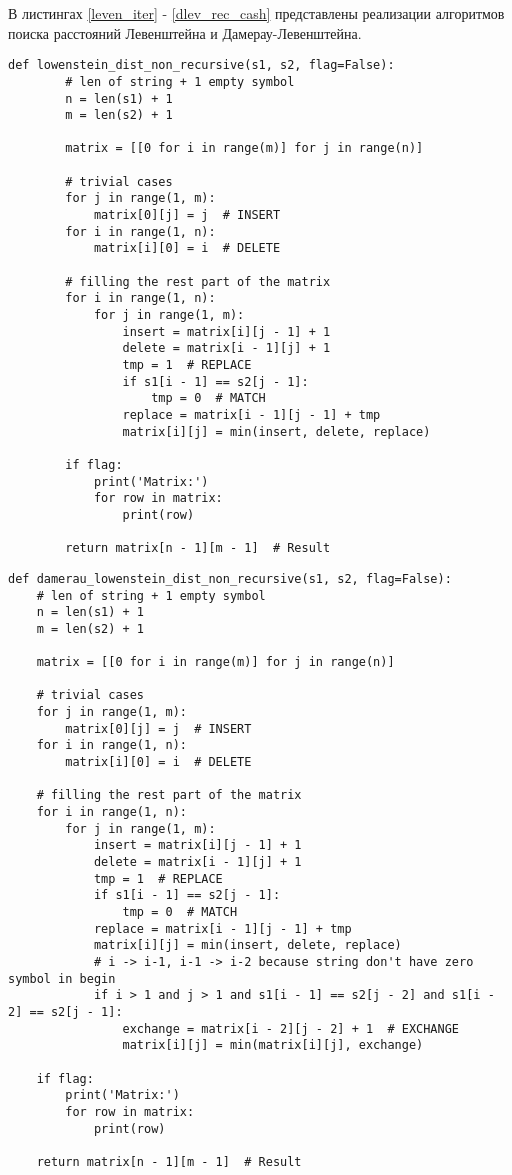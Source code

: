 В листингах \ref{leven_iter} - \ref{dlev_rec_cash} представлены реализации алгоритмов поиска расстояний Левенштейна и Дамерау-Левенштейна.

\begin{lstlisting}[caption=Функция итеративного алгоритма поиска расстояния Левенштейна с заполнением матрицы расстояний, 
    label={leven_iter}]
	def lowenstein_dist_non_recursive(s1, s2, flag=False):
        # len of string + 1 empty symbol
        n = len(s1) + 1
        m = len(s2) + 1

        matrix = [[0 for i in range(m)] for j in range(n)]

        # trivial cases
        for j in range(1, m):
            matrix[0][j] = j  # INSERT
        for i in range(1, n):
            matrix[i][0] = i  # DELETE

        # filling the rest part of the matrix
        for i in range(1, n):
            for j in range(1, m):
                insert = matrix[i][j - 1] + 1
                delete = matrix[i - 1][j] + 1
                tmp = 1  # REPLACE
                if s1[i - 1] == s2[j - 1]:
                    tmp = 0  # MATCH
                replace = matrix[i - 1][j - 1] + tmp
                matrix[i][j] = min(insert, delete, replace)

        if flag:
            print('Matrix:')
            for row in matrix:
                print(row)

        return matrix[n - 1][m - 1]  # Result
\end{lstlisting}


\begin{lstlisting}[caption=Функция итеративного алгоритма поиска расстояния Дамерау-Левенштейна с заполнением матрицы расстояний,
    label={dleven_iter}]
def damerau_lowenstein_dist_non_recursive(s1, s2, flag=False):
    # len of string + 1 empty symbol
    n = len(s1) + 1
    m = len(s2) + 1

    matrix = [[0 for i in range(m)] for j in range(n)]

    # trivial cases
    for j in range(1, m):
        matrix[0][j] = j  # INSERT
    for i in range(1, n):
        matrix[i][0] = i  # DELETE

    # filling the rest part of the matrix
    for i in range(1, n):
        for j in range(1, m):
            insert = matrix[i][j - 1] + 1
            delete = matrix[i - 1][j] + 1
            tmp = 1  # REPLACE
            if s1[i - 1] == s2[j - 1]:
                tmp = 0  # MATCH
            replace = matrix[i - 1][j - 1] + tmp
            matrix[i][j] = min(insert, delete, replace)
            # i -> i-1, i-1 -> i-2 because string don't have zero symbol in begin
            if i > 1 and j > 1 and s1[i - 1] == s2[j - 2] and s1[i - 2] == s2[j - 1]:
                exchange = matrix[i - 2][j - 2] + 1  # EXCHANGE
                matrix[i][j] = min(matrix[i][j], exchange)

    if flag:
        print('Matrix:')
        for row in matrix:
            print(row)

    return matrix[n - 1][m - 1]  # Result
\end{lstlisting}

